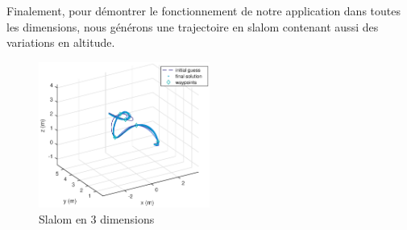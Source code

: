 Finalement, pour démontrer le fonctionnement de notre application dans toutes les dimensions, nous générons une trajectoire en slalom contenant aussi des variations en altitude.
\begin{figure}[h]
	\begin{center}
		\includegraphics[width=0.5\textwidth]{fig/slalom}
		\caption{Slalom en 3 dimensions}	
	\end{center}
\end{figure}
